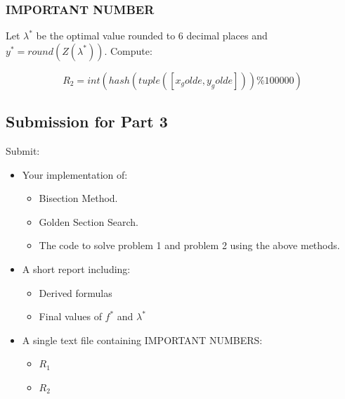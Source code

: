 \documentclass{rapportCS} %
\begin{document}
\subsubsection*{IMPORTANT NUMBER}

Let \( \lambda^* \) be the optimal value rounded to 6 decimal places and \( y^* = round(Z(\lambda^*)) \). Compute:

$$ R_2 = int(hash(tuple([x_golde, y_golde])) \% 100000) $$
\subsection*{Submission for Part 3}

Submit:
\begin{itemize}
    \item Your implementation of:
    \begin{itemize}
        \item Bisection Method.
        \item Golden Section Search.
        \item The code to solve problem 1 and problem 2 using the above methods.
    \end{itemize}
    \item A short report including:
    \begin{itemize}
        \item Derived formulas
        \item Final values of \( f^* \) and \( \lambda^* \)
    \end{itemize}
    \item A single text file containing IMPORTANT NUMBERS:
    \begin{itemize}
        \item \( R_1 \)
        \item \( R_2 \)
    \end{itemize}
\end{itemize}    
%
% 
\end{document}

